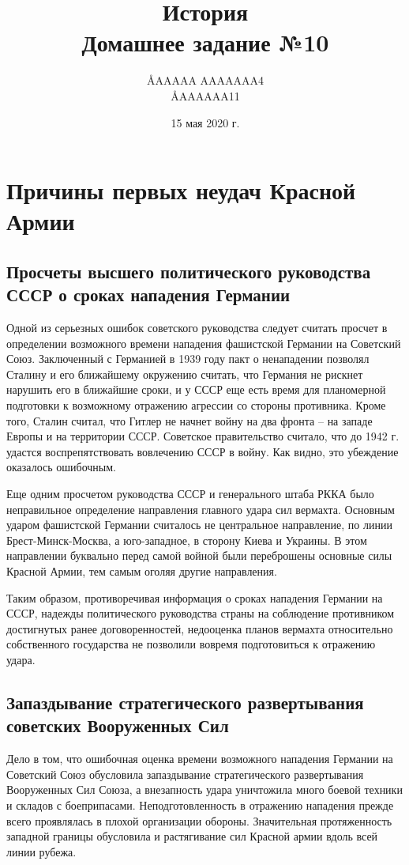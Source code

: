 \documentclass[12pt]{article}
\title{История \\ Домашнее задание №10}
\author{\AA{AAAAA AAAAAAA}{4} \\ \AA{AAAAAA}{11}}
\date{15 мая 2020 г.}
\begin{document}
  \maketitle

  \setcounter{section}{1}
  \section{Причины первых неудач Красной Армии}
  \subsection{Просчеты высшего политического руководства СССР о сроках нападения Германии}
  Одной из серьезных ошибок советского руководства следует считать просчет
  в определении возможного времени нападения фашистской Германии на Советский Союз.
  Заключенный с Германией в 1939 году пакт о ненападении позволял Сталину и его ближайшему окружению считать,
  что Германия не рискнет нарушить его в ближайшие сроки,
  и у СССР еще есть время для планомерной подготовки к возможному отражению агрессии со стороны противника.
  Кроме того, Сталин считал, что Гитлер не начнет войну на два фронта -- на западе Европы и на территории СССР.
  Советское правительство считало, что до 1942 г. удастся воспрепятствовать вовлечению СССР в войну.
  Как видно, это убеждение оказалось ошибочным.

  Еще одним просчетом руководства СССР и генерального штаба РККА было неправильное определение направления главного удара сил вермахта.
  Основным ударом фашистской Германии считалось не центральное направление, по линии Брест-Минск-Москва,
  а юго-западное, в сторону Киева и Украины.
  В этом направлении буквально перед самой войной были переброшены основные силы Красной Армии, тем самым оголяя другие направления.

  Таким образом, противоречивая информация о сроках нападения Германии на СССР, надежды политического руководства страны на соблюдение противником достигнутых ранее договоренностей, недооценка планов вермахта относительно собственного государства не позволили вовремя подготовиться к отражению удара.

  \subsection{Запаздывание стратегического развертывания советских Вооруженных Сил}
  Дело в том, что ошибочная оценка времени возможного нападения Германии на Советский Союз обусловила запаздывание стратегического развертывания Вооруженных Сил Союза, а внезапность удара уничтожила много боевой техники и складов с боеприпасами.
  Неподготовленность в отражению нападения прежде всего проявлялась в плохой организации обороны.
  Значительная протяженность западной границы обусловила и растягивание сил Красной армии вдоль всей линии рубежа.
\end{document}
